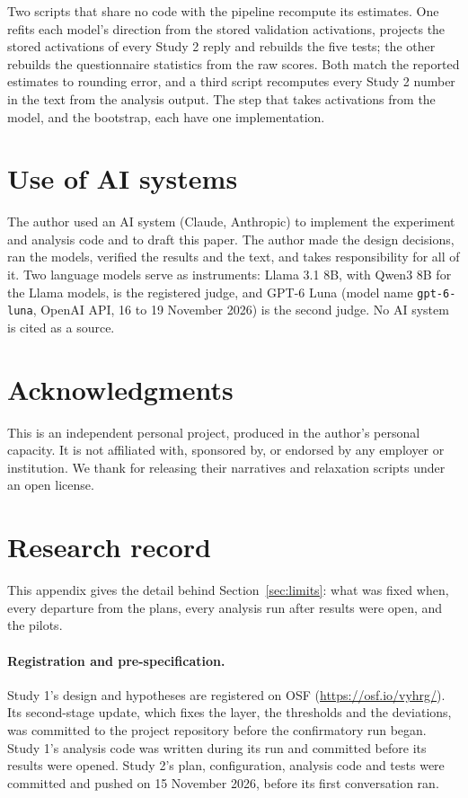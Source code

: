 \documentclass[11pt]{article}
\newcommand{\para}[1]{\paragraph{#1}}
\begin{document}
Two scripts that share no code with the pipeline recompute its estimates.
One refits each model's direction from the stored validation activations, projects the stored
activations of every Study 2 reply and rebuilds the five tests; the other rebuilds the questionnaire
statistics from the raw scores.
Both match the reported estimates to rounding error, and a third script recomputes every Study 2
number in the text from the analysis output.
The step that takes activations from the model, and the bootstrap, each have one implementation.

\section*{Use of AI systems}
The author used an AI system (Claude, Anthropic) to implement the experiment and analysis code and to
draft this paper.
The author made the design decisions, ran the models, verified the results and the text, and takes
responsibility for all of it.
Two language models serve as instruments: Llama 3.1 8B, with Qwen3 8B for the Llama models, is the
registered judge, and GPT-6 Luna (model name \texttt{gpt-6-luna}, OpenAI API, 16 to 19 November 2026)
is the second judge.
No AI system is cited as a source.

\section*{Acknowledgments}
This is an independent personal project, produced in the author's personal capacity.
It is not affiliated with, sponsored by, or endorsed by any employer or institution.
We thank \citet{benzion2025} for releasing their narratives and relaxation scripts under an open license.




\clearpage
\appendix
\section{Research record}
\label{app:record}
This appendix gives the detail behind Section~\ref{sec:limits}: what was fixed when, every departure
from the plans, every analysis run after results were open, and the pilots.

\para{Registration and pre-specification.}
Study 1's design and hypotheses are registered on OSF (\url{https://osf.io/vyhrg/}).
Its second-stage update, which fixes the layer, the thresholds and the deviations, was committed to
the project repository before the confirmatory run began.
Study 1's analysis code was written during its run and committed before its results were opened.
Study 2's plan, configuration, analysis code and tests were committed and pushed on 15 November 2026,
before its first conversation ran.
\end{document}
